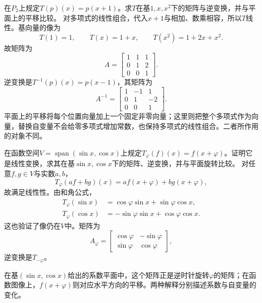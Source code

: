 在\(P_{2}\)上规定\(T \left( p \right) \left( x \right) = p \left( x + 1 \right)\)。求\(T\)在基\(1 , x , x^{2}\)下的矩阵与逆变换，并与平面上的平移比较。
\solutionanswer
对多项式的线性组合，代入\(x+1\)与相加、数乘相容，所以\(T\)线性。基向量的像为
\[
T(1)=1,\qquad T(x)=1+x,\qquad T(x^2)=1+2x+x^2.
\]
故矩阵为
\[
A=\begin{bmatrix}1&1&1\\0&1&2\\0&0&1\end{bmatrix}.
\]
逆变换是\(T^{-1}(p)(x)=p(x-1)\)，其矩阵为
\[
A^{-1}=\begin{bmatrix}1&-1&1\\0&1&-2\\0&0&1\end{bmatrix}.
\]
平面上的平移将每个位置向量加上一个固定非零向量；这里则把整个多项式作为向量，替换自变量不会给零多项式增加常数，也保持多项式的线性组合。二者所作用的对象不同。


在函数空间\(V = \operatorname{span}\left( \sin x , \cos x \right)\)上规定\(T_{\varphi} \left( f \right) \left( x \right) = f \left( x + \varphi \right)\)。证明它是线性变换，求其在基\(\sin x , \cos x\)下的矩阵、逆变换，并与平面旋转比较。
\solutionanswer
对任意\(f,g\in V\)与实数\(a,b\)，
\[
T_\varphi(af+bg)(x)=af(x+\varphi)+bg(x+\varphi),
\]
故满足线性性。由和角公式，
\[
\begin{aligned}
T_\varphi(\sin x)&=\cos\varphi\sin x+\sin\varphi\cos x,\\
T_\varphi(\cos x)&=-\sin\varphi\sin x+\cos\varphi\cos x.
\end{aligned}
\]
这也验证了像仍在\(V\)中。矩阵为
\[
A_\varphi=\begin{bmatrix}\cos\varphi&-\sin\varphi\\
\sin\varphi&\cos\varphi\end{bmatrix},
\]
逆变换是\(T_{-\varphi}\)。

在基\((\sin x,\cos x)\)给出的系数平面中，这个矩阵正是逆时针旋转\(\varphi\)的矩阵；在函数图像上，\(f(x+\varphi)\)则对应水平方向的平移。两种解释分别描述系数与自变量的变化。
\par
